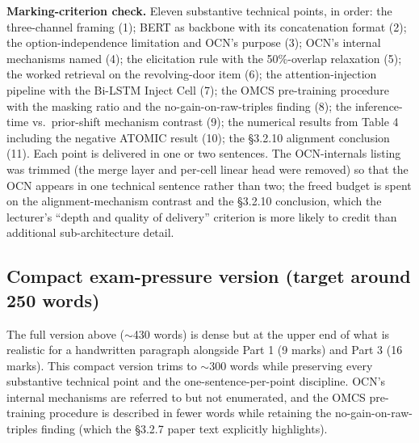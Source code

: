 \documentclass[11pt, a4paper]{article}
\begin{document}
\textbf{Marking-criterion check.} Eleven substantive technical points, in order: the three-channel framing (1); BERT as backbone with its concatenation format (2); the option-independence limitation and OCN's purpose (3); OCN's internal mechanisms named (4); the elicitation rule with the 50\%-overlap relaxation (5); the worked retrieval on the revolving-door item (6); the attention-injection pipeline with the Bi-LSTM Inject Cell (7); the OMCS pre-training procedure with the masking ratio and the no-gain-on-raw-triples finding (8); the inference-time vs.\ prior-shift mechanism contrast (9); the numerical results from Table 4 including the negative ATOMIC result (10); the §3.2.10 alignment conclusion (11). Each point is delivered in one or two sentences. The OCN-internals listing was trimmed (the merge layer and per-cell linear head were removed) so that the OCN appears in one technical sentence rather than two; the freed budget is spent on the alignment-mechanism contrast and the §3.2.10 conclusion, which the lecturer's ``depth and quality of delivery'' criterion is more likely to credit than additional sub-architecture detail.

\subsection{Compact exam-pressure version (target around 250 words)}

\begin{notebox}
The full version above ($\sim$430 words) is dense but at the upper end of what is realistic for a handwritten paragraph alongside Part 1 (9 marks) and Part 3 (16 marks). This compact version trims to $\sim$300 words while preserving every substantive technical point and the one-sentence-per-point discipline. OCN's internal mechanisms are referred to but not enumerated, and the OMCS pre-training procedure is described in fewer words while retaining the no-gain-on-raw-triples finding (which the §3.2.7 paper text explicitly highlights).
\end{notebox}
\end{document}
